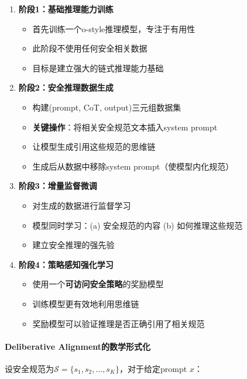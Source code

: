 \documentclass[12pt,a4paper]{article}
\begin{document}
\begin{enumerate}
    \item \textbf{阶段1：基础推理能力训练}
    \begin{itemize}
        \item 首先训练一个o-style推理模型，专注于有用性
        \item 此阶段不使用任何安全相关数据
        \item 目标是建立强大的链式推理能力基础
    \end{itemize}
    
    \item \textbf{阶段2：安全推理数据生成}
    \begin{itemize}
        \item 构建(prompt, CoT, output)三元组数据集
        \item \textbf{关键操作}：将相关安全规范文本插入system prompt
        \item 让模型生成引用这些规范的思维链
        \item 生成后从数据中移除system prompt（使模型内化规范）
    \end{itemize}
    
    \item \textbf{阶段3：增量监督微调}
    \begin{itemize}
        \item 对生成的数据进行监督学习
        \item 模型同时学习：(a) 安全规范的内容 (b) 如何推理这些规范
        \item 建立安全推理的强先验
    \end{itemize}
    
    \item \textbf{阶段4：策略感知强化学习}
    \begin{itemize}
        \item 使用一个\textbf{可访问安全策略}的奖励模型
        \item 训练模型更有效地利用思维链
        \item 奖励模型可以验证推理是否正确引用了相关规范
    \end{itemize}
\end{enumerate}

\paragraph{Deliberative Alignment的数学形式化}

设安全规范为$\mathcal{S} = \{s_1, s_2, \ldots, s_K\}$，对于给定prompt $x$：
\end{document}
